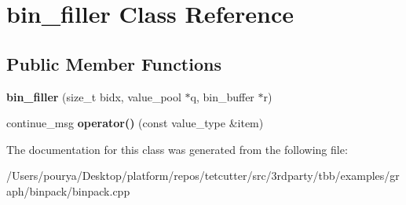 \hypertarget{classbin__filler}{}\section{bin\+\_\+filler Class Reference}
\label{classbin__filler}
\subsection*{Public Member Functions}
\begin{DoxyCompactItemize}
\item 
\hypertarget{classbin__filler_ab267f3296914bcc50ed24685a84e8b4c}{}{\bfseries bin\+\_\+filler} (size\+\_\+t bidx, value\+\_\+pool $\ast$q, bin\+\_\+buffer $\ast$r)\label{classbin__filler_ab267f3296914bcc50ed24685a84e8b4c}

\item 
\hypertarget{classbin__filler_af6448b960bd650c588225cb3a2e4484f}{}continue\+\_\+msg {\bfseries operator()} (const value\+\_\+type \&item)\label{classbin__filler_af6448b960bd650c588225cb3a2e4484f}

\end{DoxyCompactItemize}


The documentation for this class was generated from the following file\+:\begin{DoxyCompactItemize}
\item 
/\+Users/pourya/\+Desktop/platform/repos/tetcutter/src/3rdparty/tbb/examples/graph/binpack/binpack.\+cpp\end{DoxyCompactItemize}
